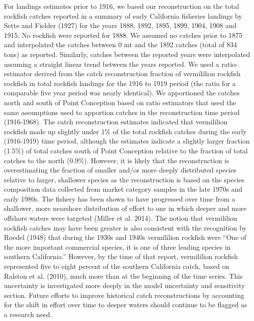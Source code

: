 \documentclass[11pt,
  english,
]{article}
\begin{document}
For landings estimates prior to 1916, we based our reconstruction on the total rockfish catches reported in a summary of early California fisheries landings by Sette and Fielder {(1927)\leavevmode\tagmcend\tagstructend} for the years 1888, 1892, 1895, 1899, 1904, 1908 and 1915. No rockfish were reported for 1888. We assumed no catches prior to 1875 and interpolated the catches between 0 mt and the 1892 catches (total of 834 tons) as reported. Similarly, catches between the reported years were interpolated assuming a straight linear trend between the years reported. We used a ratio-estimator derived from the catch reconstruction fraction of vermililion rockfish rockfish in total rockfish landings for the 1916 to 1919 period (the ratio for a comparable five year period was nearly identical). We apportioned the catches north and south of Point Conception based on ratio estimators that used the same assumptions used to apportion catches in the reconstruction time period (1916-1968). The catch reconstruction estimates indicated that vermililion rockfish made up slightly under 1\% of the total rockfish catches during the early (1916-1919) time period, although the estimates indicate a slightly larger fraction (1.5\%) of total catches south of Point Conception relative to the fraction of total catches to the north (0.9\%). However, it is likely that the reconstruction is overestimating the fraction of smaller and/or more deeply distributed species relative to larger, shallower species as the reconstruction is based on the species composition data collected from market category samples in the late 1970s and early 1980s. The fishery has been shown to have progressed over time from a shallower, more nearshore distribution of effort to one in which deeper and more offshore waters were targeted {(Miller et al. 2014)\leavevmode\tagmcend\tagstructend}. The notion that vermililion rockfish catches may have been greater is also consistent with the recognition by Roedel {(1948)\leavevmode\tagmcend\tagstructend} that during the 1930s and 1940s vermililion rockfish were ``One of the more important commercial species, it is one of three leading species in southern California.'' However, by the time of that report, vermililion rockfish represented five to eight percent of the southern California catch, based on Ralston et al. {(2010)\leavevmode\tagmcend\tagstructend}, much more than at the beginning of the time series. This uncertainty is investigated more deeply in the model uncertainty and sensitivity section. Future efforts to improve historical catch reconstructions by accounting for the shift in effort over time to deeper waters should continue to be flagged as a research need.
\end{document}
